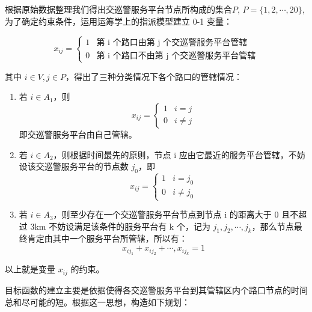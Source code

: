 \documentclass{cumcmthesis}
\begin{document}
      根据原始数据整理我们得出交巡警服务平台节点所构成的集合$P$, $P = \{ 1, 2, \cdots, 20\}$,为了确定约束条件，运用运筹学上的指派模型建立 0-1 变量：

      \begin{equation}
        x_{ij} =
        \begin{cases}
          1 & \text{第 i 个路口由第 j 个交巡警服务平台管辖}   \\
          0 & \text{第 i 个路口不由第 j 个交巡警服务平台管辖}
        \end{cases}
      \end{equation}

      其中 $i \in V, j \in P$，得出了三种分类情况下各个路口的管辖情况：
      \begin{enumerate}
        \item 若 $i \in A_1$，则
              \begin{equation}
                x_{ij} =
                \begin{cases}
                  1 & i = j   \\
                  0 & i \ne j
                \end{cases}
              \end{equation}
              即交巡警服务平台由自己管辖。
        \item 若 $i \in A_2$，则根据时间最先的原则，节点 i 应由它最近的服务平台管辖，不妨设该交巡警服务平台的节点数 $j_0$，即
              \begin{equation}
                x_{ij} =
                \begin{cases}
                  1 & i = j_0   \\
                  0 & i \ne j_0
                \end{cases}
              \end{equation}
        \item 若 $i \in A_3$，则至少存在一个交巡警服务平台节点到节点 i 的距离大于 0 且不超过 3km 不妨设满足该条件的服务平台有 k 个，记为 $j_1, j_2, \cdots, j_k$，那么节点最终肯定由其中一个服务平台所管辖，所以有：
              \begin{equation}
                x_{ij_1} + x_{ij_2} + \cdots, x_{ij_k} = 1
              \end{equation}
      \end{enumerate}

      以上就是变量 $x_{ij}$ 的约束。

      目标函数的建立主要是依据使得各交巡警服务平台到其管辖区内个路口节点的时间总和尽可能的短。根据这一思想，构造如下规划：\cite{moxk}
\end{document}
